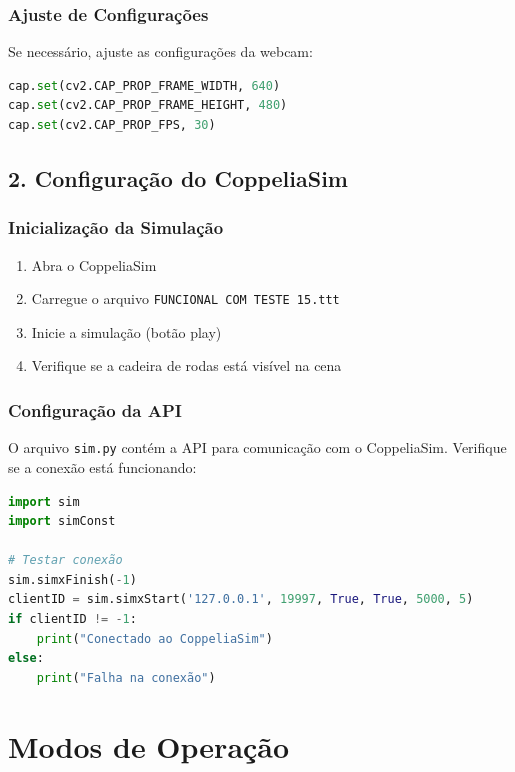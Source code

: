 \documentclass[12pt,a4paper]{article}
\begin{document}
\subsubsection{Ajuste de Configurações}

Se necessário, ajuste as configurações da webcam:

\begin{lstlisting}[language=python]
cap.set(cv2.CAP_PROP_FRAME_WIDTH, 640)
cap.set(cv2.CAP_PROP_FRAME_HEIGHT, 480)
cap.set(cv2.CAP_PROP_FPS, 30)
\end{lstlisting}

\subsection{2. Configuração do CoppeliaSim}

\subsubsection{Inicialização da Simulação}

\begin{enumerate}
    \item Abra o CoppeliaSim
    \item Carregue o arquivo \texttt{FUNCIONAL COM TESTE 15.ttt}
    \item Inicie a simulação (botão play)
    \item Verifique se a cadeira de rodas está visível na cena
\end{enumerate}

\subsubsection{Configuração da API}

O arquivo \texttt{sim.py} contém a API para comunicação com o CoppeliaSim. Verifique se a conexão está funcionando:

\begin{lstlisting}[language=python]
import sim
import simConst

# Testar conexão
sim.simxFinish(-1)
clientID = sim.simxStart('127.0.0.1', 19997, True, True, 5000, 5)
if clientID != -1:
    print("Conectado ao CoppeliaSim")
else:
    print("Falha na conexão")
\end{lstlisting}

\section{Modos de Operação}
\end{document}
